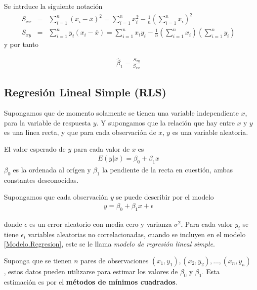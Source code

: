 Se intrduce la siguiente notaci\'on
\begin{eqnarray}
S_{xx}&=&\sum_{i=1}^{n}\left(x_{i}-\overline{x}\right)^{2}=\sum_{i=1}^{n}x_{i}^{2}-\frac{1}{n}\left(\sum_{i=1}^{n}x_{i}\right)^{2}\\
S_{xy}&=&\sum_{i=1}^{n}y_{i}\left(x_{i}-\overline{x}\right)=\sum_{i=1}^{n}x_{i}y_{i}-\frac{1}{n}\left(\sum_{i=1}^{n}x_{i}\right)\left(\sum_{i=1}^{n}y_{i}\right)
\end{eqnarray}
y por tanto





\begin{eqnarray}
\hat{\beta}_{1}=\frac{S_{xy}}{S_{xx}}
\end{eqnarray}




\subsection{Regresi\'on Lineal Simple (RLS)}





Supongamos que de momento solamente se tienen una variable independiente $x$, para la variable de respuesta $y$. Y supongamos que la relaci\'on que hay entre $x$ y $y$ es una l\'inea recta, y que para cada observaci\'on de $x$, $y$ es una variable aleatoria.

El valor esperado de $y$ para cada valor de $x$ es
\begin{eqnarray}
E\left(y|x\right)=\beta_{0}+\beta_{1}x
\end{eqnarray}
$\beta_{0}$ es la ordenada al or\'igen y  $\beta_{1}$ la pendiente de la recta en cuesti\'on, ambas constantes desconocidas. 

Supongamos que cada observaci\'on $y$ se puede describir por el modelo
\begin{eqnarray}\label{Modelo.Regresion}
y=\beta_{0}+\beta_{1}x+\epsilon
\end{eqnarray}





donde $\epsilon$ es un error aleatorio con media cero y varianza $\sigma^{2}$. Para cada valor $y_{i}$ se tiene $\epsilon_{i}$ variables aleatorias no correlacionadas, cuando se incluyen en el modelo \ref{Modelo.Regresion}, este se le llama \textit{modelo de regresi\'on lineal simple}.


Suponga que se tienen $n$ pares de observaciones $\left(x_{1},y_{1}\right),\left(x_{2},y_{2}\right),\ldots,\left(x_{n},y_{n}\right)$,  estos datos pueden utilizarse para estimar los valores de $\beta_{0}$ y $\beta_{1}$. Esta estimaci\'on es por el \textbf{m\'etodos de m\'inimos cuadrados}.



